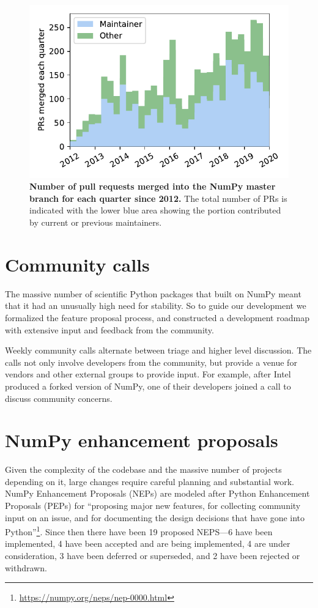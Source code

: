 \begin{figure}
    \centering
    \includegraphics[width=0.9\linewidth]{scripts/PRs-using-CURRENT_MAINTAINERS.pdf}
    \caption{\textbf{Number of pull requests merged into the NumPy master branch for each
        quarter since 2012.} The total number of PRs is indicated with the
        lower blue area showing the portion contributed by current or previous
        maintainers.}\label{fig:prs-over-time}
\end{figure}



\section*{Community calls}

The massive number of scientific Python packages that
built on NumPy meant that it had an unusually high need for stability.
So to guide our development we formalized the feature proposal process, and
constructed a development roadmap with extensive input and feedback from the
community.


Weekly community calls alternate between triage and
higher level discussion.  The calls not only involve developers from
the community, but provide a venue for vendors and other external
groups to provide input.  For example, after Intel produced a forked
version of NumPy, one of their developers joined a call to discuss
community concerns.

\section*{NumPy enhancement proposals}

Given the complexity of the codebase and the massive number of projects depending
on it, large changes require careful planning and substantial work.
NumPy Enhancement Proposals (NEPs) are modeled after
Python Enhancement Proposals (PEPs) for ``proposing major new
features, for collecting community input on an issue, and for
documenting the design decisions that have gone into
Python''\footnote{\url{https://numpy.org/neps/nep-0000.html}}.
Since then there have been 19 proposed NEPS---6 have been implemented,
4 have been accepted and are being implemented, 4 are under
consideration, 3 have been deferred or superseded, and 2 have been rejected
or withdrawn.


